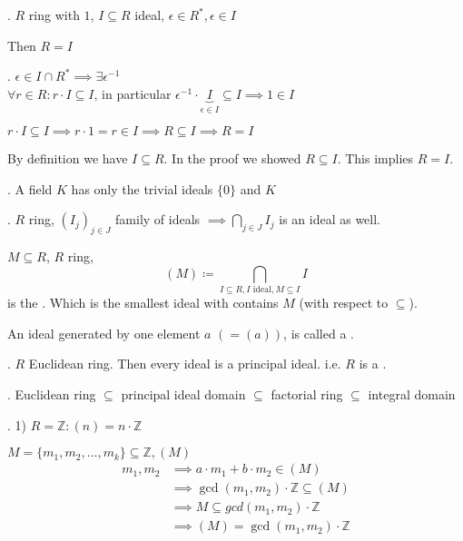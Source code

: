 \Theorem.
$R$ ring with $1$, $I \subseteq R$ ideal, $ \epsilon \in R^{*}, \epsilon \in I$

Then $R = I$

\Proof.
$\epsilon \in I \cap R^{*} \implies \exists \epsilon^{-1}$ \\
$\forall r \in R: r \cdot I \subseteq I$, in particular $\epsilon^{-1} \cdot \underbrace{I}_{\epsilon \in I} \subseteq I \implies 1 \in I$

$r \cdot I \subseteq I \implies r \cdot 1 = r \in I \implies R \subseteq I \implies R = I$

By definition we have $I \subseteq R$. In the proof we showed $R \subseteq I$. This implies $R = I$.

\Corollary.
A field $K$ has only the trivial ideals $\{0\}$ and $K$

\Remark.
$R$ ring, $(I_j)_{j\in J}$ family of ideals $\implies \bigcap_{j \in J} I_j$ is an ideal as well.

\begin{definition}
  $M \subseteq R$, $R$ ring,
  \[
    (M)\coloneqq \bigcap_{I \subseteq R, I \text{ ideal}, M \subseteq I} I
  \]
  is the . Which is the smallest ideal with contains $M$ (with respect to $\subseteq$).
\end{definition}

\begin{definition}
  An ideal generated by one element $a$ $\left( =(a) \right)$, is called a .
\end{definition}

\Theorem.
$R$ Euclidean ring. Then every ideal is a principal ideal.
i.e. $R$ is a .

\Remark.
Euclidean ring $\subseteq$ principal ideal domain $\subseteq$ factorial ring $\subseteq$ integral domain

\Example.
1) $R=\mathbb{Z}: (n) = n\cdot \mathbb{Z}$

$M = \{m_1, m_2, \ldots, m_k\} \subseteq \mathbb{Z}, (M)$\\
\begin{align*}
  m_1, m_2 &\implies a \cdot m_1 + b\cdot m_2 \in (M) \\
           &\implies \gcd(m_1,m_2) \cdot \mathbb{Z} \subseteq (M) \\
           &\implies M \subseteq gcd(m_1,m_2) \cdot \mathbb{Z} \\
           &\implies (M) = \gcd(m_1,m_2) \cdot \mathbb{Z}
\end{align*}


